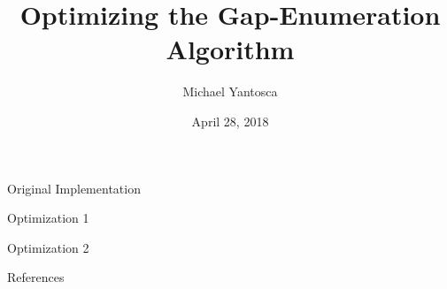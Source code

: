 \documentclass{beamer}
\author{Michael Yantosca}
\institute{University of Houston}
\date{April 28, 2018}
\title[Closing the Gap]{Optimizing the Gap-Enumeration Algorithm}
\begin{document}
\begin{frame}
  \titlepage
\end{frame}
\begin{frame}{Original Implementation}
\end{frame}
\begin{frame}{Optimization 1}
\end{frame}
\begin{frame}{Optimization 2}
\end{frame}
\begin{frame}[allowframebreaks]{References}
  \printbibliography
\end{frame}
\end{document}
